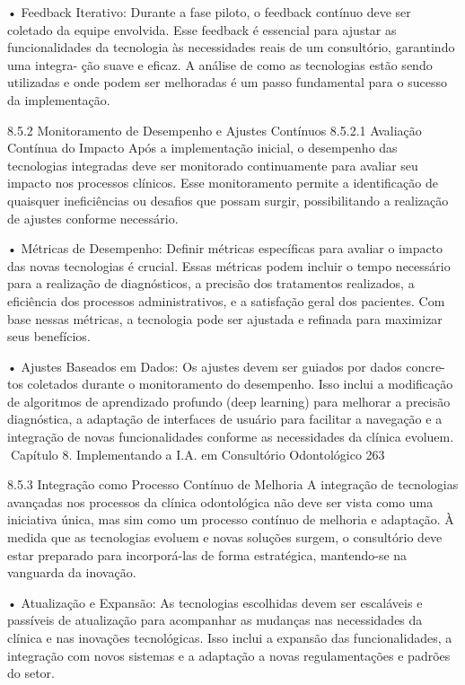     • Feedback Iterativo: Durante a fase piloto, o feedback contínuo deve ser coletado
      da equipe envolvida. Esse feedback é essencial para ajustar as funcionalidades
      da tecnologia às necessidades reais de um consultório, garantindo uma integra-
      ção suave e eficaz. A análise de como as tecnologias estão sendo utilizadas
      e onde podem ser melhoradas é um passo fundamental para o sucesso da
      implementação.

8.5.2     Monitoramento de Desempenho e Ajustes Contínuos
8.5.2.1   Avaliação Contínua do Impacto
Após a implementação inicial, o desempenho das tecnologias integradas deve ser
monitorado continuamente para avaliar seu impacto nos processos clínicos.
        Esse monitoramento permite a identificação de quaisquer ineficiências ou
desafios que possam surgir, possibilitando a realização de ajustes conforme necessário.

    • Métricas de Desempenho: Definir métricas específicas para avaliar o impacto
      das novas tecnologias é crucial. Essas métricas podem incluir o tempo necessário
      para a realização de diagnósticos, a precisão dos tratamentos realizados, a
      eficiência dos processos administrativos, e a satisfação geral dos pacientes. Com
      base nessas métricas, a tecnologia pode ser ajustada e refinada para maximizar
      seus benefícios.

    • Ajustes Baseados em Dados: Os ajustes devem ser guiados por dados concre-
      tos coletados durante o monitoramento do desempenho. Isso inclui a modificação
      de algoritmos de aprendizado profundo (deep learning) para melhorar a precisão
      diagnóstica, a adaptação de interfaces de usuário para facilitar a navegação
      e a integração de novas funcionalidades conforme as necessidades da clínica
      evoluem.
Capítulo 8. Implementando a I.A. em Consultório Odontológico                       263


8.5.3    Integração como Processo Contínuo de Melhoria
A integração de tecnologias avançadas nos processos da clínica odontológica não deve
ser vista como uma iniciativa única, mas sim como um processo contínuo de melhoria
e adaptação. À medida que as tecnologias evoluem e novas soluções surgem, o
consultório deve estar preparado para incorporá-las de forma estratégica, mantendo-se
na vanguarda da inovação.

    • Atualização e Expansão: As tecnologias escolhidas devem ser escaláveis e
      passíveis de atualização para acompanhar as mudanças nas necessidades da
      clínica e nas inovações tecnológicas. Isso inclui a expansão das funcionalidades,
      a integração com novos sistemas e a adaptação a novas regulamentações e
      padrões do setor.

